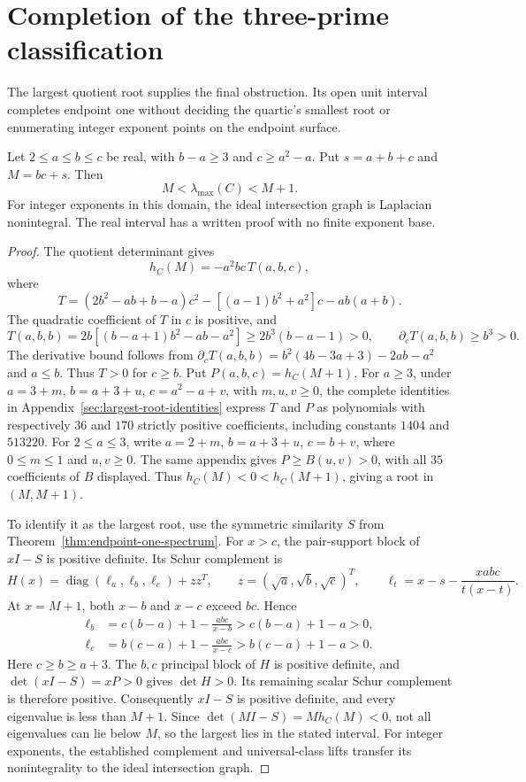 \section{Completion of the three-prime classification}
\label{sec:three-prime-classification}

The largest quotient root supplies the final obstruction. Its open unit
interval completes endpoint one without deciding the quartic's smallest
root or enumerating integer exponent points on the endpoint surface.

\begin{theorem}
\label{thm:largest-root-unit-interval}
Let $2\leq a\leq b\leq c$ be real, with $b-a\geq3$ and $c\geq a^2-a$.
Put $s=a+b+c$ and $M=bc+s$. Then
\[
 M<\lambda_{\max}(C)<M+1.
\]
For integer exponents in this domain, the ideal intersection graph is
Laplacian nonintegral. The real interval has a written proof with no
finite exponent base.
\end{theorem}

\begin{proof}
The quotient determinant gives
\[
 h_C(M)=-a^2bc\,T(a,b,c),
\]
where
\[
 T=(2b^2-ab+b-a)c^2-[(a-1)b^2+a^2]c-ab(a+b).
\]
The quadratic coefficient of $T$ in $c$ is positive, and
\[
 T(a,b,b)=2b[(b-a+1)b^2-ab-a^2]\geq2b^3(b-a-1)>0,
 \qquad \partial_cT(a,b,b)\geq b^3>0.
\]
The derivative bound follows from
$\partial_cT(a,b,b)=b^2(4b-3a+3)-2ab-a^2$ and $a\leq b$.
Thus $T>0$ for $c\geq b$. Put $P(a,b,c)=h_C(M+1)$. For $a\geq3$, under
$a=3+m$, $b=a+3+u$, $c=a^2-a+v$, with $m,u,v\geq0$,
the complete identities in Appendix~\ref{sec:largest-root-identities}
express $T$ and $P$ as polynomials with respectively $36$ and $170$
strictly positive coefficients, including constants $1404$ and $513220$.
For $2\leq a\leq3$, write $a=2+m$, $b=a+3+u$, $c=b+v$,
where $0\leq m\leq1$ and $u,v\geq0$. The same appendix gives
$P\geq B(u,v)>0$, with all $35$ coefficients of $B$ displayed.
Thus $h_C(M)<0<h_C(M+1)$, giving a root in $(M,M+1)$.

To identify it as the largest root, use the symmetric similarity $S$
from Theorem~\ref{thm:endpoint-one-spectrum}. For $x>c$, the pair-support
block of $xI-S$ is positive definite. Its Schur complement is
\[
 H(x)=\operatorname{diag}(\ell_a,\ell_b,\ell_c)+zz^T,\qquad
 z=(\sqrt a,\sqrt b,\sqrt c)^T,\qquad
 \ell_t=x-s-\frac{xabc}{t(x-t)}.
\]
At $x=M+1$, both $x-b$ and $x-c$ exceed $bc$. Hence
\begin{align*}
 \ell_b&=c(b-a)+1-\frac{abc}{x-b}>c(b-a)+1-a>0,\\
 \ell_c&=b(c-a)+1-\frac{abc}{x-c}>b(c-a)+1-a>0.
\end{align*}
Here $c\geq b\geq a+3$. The $b,c$ principal block of $H$ is
positive definite, and $\det(xI-S)=xP>0$ gives $\det H>0$.
Its remaining scalar Schur complement is therefore positive.
Consequently $xI-S$ is positive definite, and every eigenvalue is less
than $M+1$. Since $\det(MI-S)=Mh_C(M)<0$, not all eigenvalues can
lie below $M$, so the largest lies in the stated interval. For integer exponents,
the established complement and universal-class lifts transfer its
nonintegrality to the ideal intersection graph.
\end{proof}

